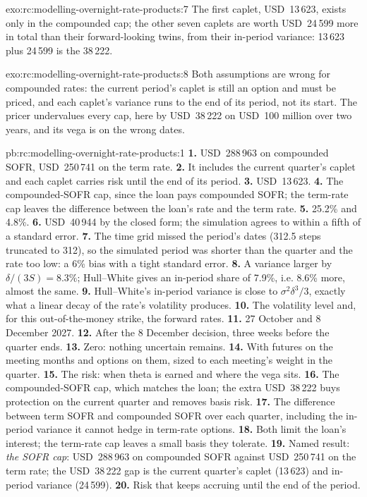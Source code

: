 \begin{solution}{exo:rc:modelling-overnight-rate-products:7}
The first caplet, USD~13\,623, exists only in the compounded cap; the other seven
caplets are worth USD~24\,599 more in total than their forward-looking twins, from
their in-period variance: 13\,623 plus 24\,599 is the 38\,222.
\end{solution}

\begin{solution}{exo:rc:modelling-overnight-rate-products:8}
Both assumptions are wrong for compounded rates: the current period's caplet is
still an option and must be priced, and each caplet's variance runs to the end of
its period, not its start. The pricer undervalues every cap, here by USD~38\,222 on
USD~100 million over two years, and its vega is on the wrong dates.
\end{solution}

\begin{solution}{pb:rc:modelling-overnight-rate-products:1}
\textbf{1.} USD~288\,963 on compounded SOFR, USD~250\,741 on the term rate.
\textbf{2.} It includes the current quarter's caplet and each caplet carries risk
until the end of its period.
\textbf{3.} USD~13\,623.
\textbf{4.} The compounded-SOFR cap, since the loan pays compounded SOFR; the term-rate
cap leaves the difference between the loan's rate and the term rate.
\textbf{5.} 25.2\% and 4.8\%.
\textbf{6.} USD~40\,944 by the closed form; the simulation agrees to within a fifth of a
standard error.
\textbf{7.} The time grid missed the period's dates (312.5 steps truncated to 312), so the
simulated period was shorter than the quarter and the rate too low: a 6\% bias with a
tight standard error.
\textbf{8.} A variance larger by $\delta/(3S) = 8.3\%$; Hull--White gives an in-period
share of 7.9\%, i.e. 8.6\% more, almost the same.
\textbf{9.} Hull--White's in-period variance is close to $\sigma^2\delta^3/3$, exactly what a
linear decay of the rate's volatility produces.
\textbf{10.} The volatility level and, for this out-of-the-money strike, the forward
rates.
\textbf{11.} 27 October and 8 December 2027.
\textbf{12.} After the 8 December decision, three weeks before the quarter ends.
\textbf{13.} Zero: nothing uncertain remains.
\textbf{14.} With futures on the meeting months and options on them, sized to each
meeting's weight in the quarter.
\textbf{15.} The risk: when theta is earned and where the vega sits.
\textbf{16.} The compounded-SOFR cap, which matches the loan; the extra USD~38\,222 buys
protection on the current quarter and removes basis risk.
\textbf{17.} The difference between term SOFR and compounded SOFR over each quarter,
including the in-period variance it cannot hedge in term-rate options.
\textbf{18.} Both limit the loan's interest; the term-rate cap leaves a small basis they
tolerate.
\textbf{19.} Named result: \emph{the SOFR cap}: USD~288\,963 on compounded SOFR against
USD~250\,741 on the term rate; the USD~38\,222 gap is the current quarter's caplet
(13\,623) and in-period variance (24\,599).
\textbf{20.} Risk that keeps accruing until the end of the period.
\end{solution}

